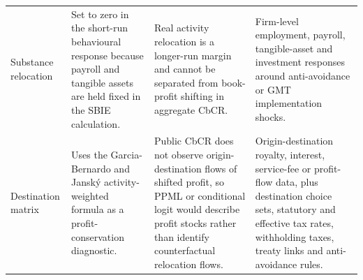 \begin{table}[H]
\begin{adjustbox}{max width=\textwidth,center}
\begin{tabular}{@{}L{2.7cm}L{4.1cm}L{3.7cm}L{5.1cm}@{}}
Substance relocation & Set to zero in the short-run behavioural response because payroll and tangible assets are held fixed in the SBIE calculation. & Real activity relocation is a longer-run margin and cannot be separated from book-profit shifting in aggregate CbCR. & Firm-level employment, payroll, tangible-asset and investment responses around anti-avoidance or GMT implementation shocks. \\
Destination matrix & Uses the Garcia-Bernardo and Janský activity-weighted formula as a profit-conservation diagnostic. & Public CbCR does not observe origin-destination flows of shifted profit, so PPML or conditional logit would describe profit stocks rather than identify counterfactual relocation flows. & Origin-destination royalty, interest, service-fee or profit-flow data, plus destination choice sets, statutory and effective tax rates, withholding taxes, treaty links and anti-avoidance rules. \\
\bottomrule
\end{tabular}
\end{adjustbox}
\end{table}
